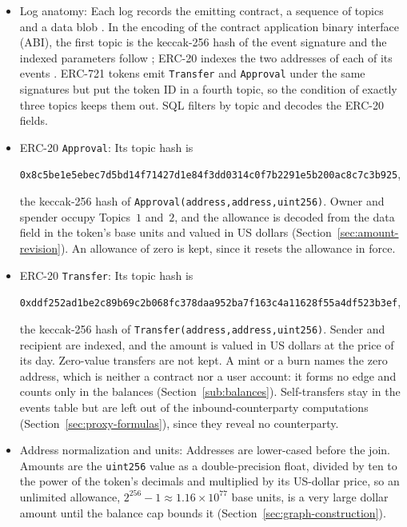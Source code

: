 \begin{itemize}
\item Log anatomy: Each log records the emitting contract, a sequence of topics and a data blob \parencite{wood2025yellowpaper}. In the encoding of the contract application binary interface (ABI), the first topic is the keccak-256 hash of the event signature and the indexed parameters follow \parencite{soliditynddocsabi}; ERC-20 indexes the two addresses of each of its events \parencite{vogelsteller2015erc20}. ERC-721 tokens emit \texttt{Transfer} and \texttt{Approval} under the same signatures but put the token ID in a fourth topic, so the condition of exactly three topics keeps them out. SQL filters by topic and decodes the ERC-20 fields.

\item ERC-20 \texttt{Approval}: Its topic hash is
\begin{center}
\texttt{0x8c5be1e5ebec7d5bd14f71427d1e84f3dd0314c0f7b2291e5b200ac8c7c3b925},
\end{center}
the keccak-256 hash of \texttt{Approval(address,address,uint256)}. Owner and spender occupy Topics~$1$ and~$2$, and the allowance is decoded from the data field in the token's base units and valued in US dollars (Section~\ref{sec:amount-revision}). An allowance of zero is kept, since it resets the allowance in force.

\item ERC-20 \texttt{Transfer}: Its topic hash is
\begin{center}
\texttt{0xddf252ad1be2c89b69c2b068fc378daa952ba7f163c4a11628f55a4df523b3ef},
\end{center}
the keccak-256 hash of \texttt{Transfer(address,address,uint256)}. Sender and recipient are indexed, and the amount is valued in US dollars at the price of its day. Zero-value transfers are not kept. A mint or a burn names the zero address, which is neither a contract nor a user account: it forms no edge and counts only in the balances (Section~\ref{sub:balances}). Self-transfers stay in the events table but are left out of the inbound-counterparty computations (Section~\ref{sec:proxy-formulas}), since they reveal no counterparty.

\item Address normalization and units: Addresses are lower-cased before the join. Amounts are the \texttt{uint256} value as a double-precision float, divided by ten to the power of the token's decimals and multiplied by its US-dollar price, so an unlimited allowance, $2^{256}-1\approx1.16\times10^{77}$ base units, is a very large dollar amount until the balance cap bounds it (Section~\ref{sec:graph-construction}).

\end{itemize}

